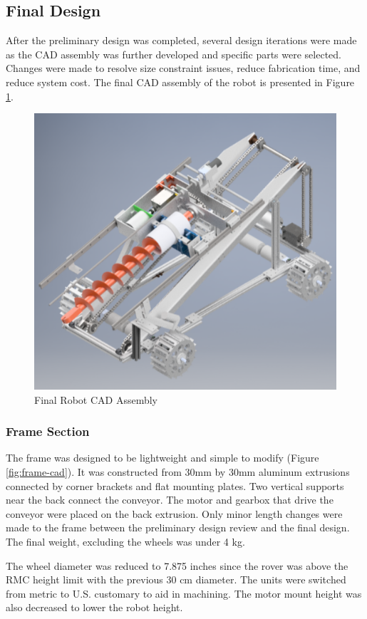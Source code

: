 \documentclass[class=article, crop=false]{standalone}
\begin{document}
	\subsection{Final Design}
	\label{subsec:final-design}
	
	After the preliminary design was completed, several design iterations were made as the CAD assembly was further developed and specific parts were selected. Changes were made to resolve size constraint issues, reduce fabrication time, and reduce system cost. The final CAD assembly of the robot is presented in Figure \ref{fig:final-cad}.
	
	\FloatBarrier
	\begin{figure}[h]
	\centering
	 \includegraphics[width=0.5\linewidth]{09_Figures/final-cad.jpg}
	 \caption{Final Robot CAD Assembly}
	 \label{fig:final-cad}
	\end{figure}
	\FloatBarrier
	
	\subsubsection{Frame Section}
	
	The frame was designed to be lightweight and simple to modify (Figure \ref{fig:frame-cad}). It was constructed from 30mm by 30mm aluminum extrusions connected by corner brackets and flat mounting plates. Two vertical supports near the back connect the conveyor. The motor and gearbox that drive the conveyor were placed on the back extrusion. Only minor length changes were made to the frame between the preliminary design review and the final design. The final weight, excluding the wheels was under 4 kg.
	
	The wheel diameter was reduced to 7.875 inches since the rover was above the RMC height limit with the previous 30 cm diameter. The units were switched from metric to U.S. customary to aid in machining. The motor mount height was also decreased to lower the robot height.
\end{document}
